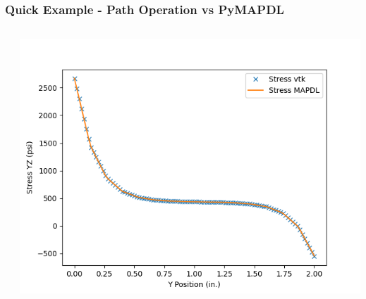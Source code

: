 \documentclass[t]{beamer}
\begin{document}
\begin{frame}
  \frametitle{Quick Example - Path Operation vs PyMAPDL}

  \begin{columns}[T]
    \begin{column}{.5\textwidth}
      \vspace{-15pt}
      \inputminted[fontsize=\footnotesize]{python}{code/path_op_vs_pymapdl.py}
    \end{column}

    \begin{column}{.5\textwidth}
      \vspace{-15pt}
      \centering
      \includegraphics[width=1.0\textwidth]{figures/path_op_vs_pymapdl.png}
    \end{column}
  \end{columns}


\end{frame}


\end{document}
